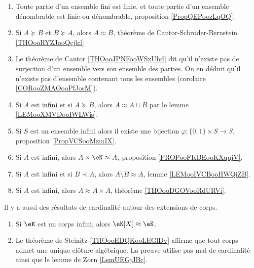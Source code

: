 \begin{enumerate}
	\item
	      Toute partie d'un ensemble fini est finie, et toute partie d'un ensemble dénombrable est finie ou dénombrable, proposition \ref{PropQEPoozLqOQ}.
	\item
	      Si \( A\succeq B\) et \( B\succeq A\), alors \( A\approx B\), théorème de Cantor-Schröder-Bernstein \ref{THOooRYZJooQcjlcl}
	\item
	      Le théorème de Cantor \ref{THOooJPNFooWSxUhd} dit qu'il n'existe pas de surjection d'un ensemble vers son ensemble des parties. On en déduit qu'il n'existe pas d'ensemble contenant tous les ensembles (corolaire \ref{CORooZMAOooPfJosM}).
	\item
	      Si \( A\) est infini et si \( A\succeq B\), alors \( A\approx A\cup B\) par le lemme \ref{LEMooXMVDooIWLWis}.
	\item
	      Si \( S\) est un ensemble infini alors il existe une bijection \( \varphi\colon \{ 0,1 \}\times S\to S\), proposition \ref{PropVCSooMzmIX}.
	\item
	      Si \( A\) est infini, alors \( A\times \eN\approx A\), proposition \ref{PROPooFKBEooKXqujV}.
	\item
	      Si \( A\) est infini et si \( B\prec A\), alors \( A\setminus B\approx A\), lemme \ref{LEMooIVCBooHWQiZB}.
	\item
	      Si \( A\) est infini, alors \( A\approx A\times A\), théorème \ref{THOooDGOVooRdURVi}.
\end{enumerate}

Il y a aussi des résultats de cardinalité autour des extensions de corps.
\begin{enumerate}
	\item
	      Si \( \eK\) est un corps infini, alors \( \eK[X]\approx \eK\).
	\item
	      Le théorème de Steinitz \ref{THOooEDQKooLEGlDv} affirme que tout corps admet une unique clôture algébrique. La preuve utilise pas mal de cardinalité ainsi que le lemme de Zorn \ref{LemUEGjJBc}.
\end{enumerate}
